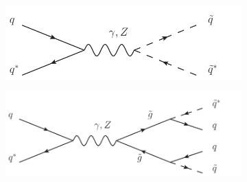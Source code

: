 \documentclass[twoside,english]{uiofysmaster}
\begin{document}
\begin{figure}[hbt]
	\centering
	\begin{subfigure}[b]{0.4\textwidth}
		\includegraphics[width=\textwidth]{figures/qqbar_to_tildeqqbar_s_channel.pdf} 
		\caption{ }
	\end{subfigure}
	\begin{subfigure}[b]{0.4\textwidth}
		\includegraphics[width=\textwidth]{figures/qqbar_to_gluinos_to_qqtildeqq_s_channel.pdf}
		\caption{ } 
	\end{subfigure}


\end{figure}
\end{document}
